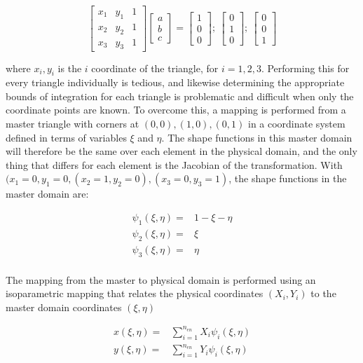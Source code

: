 \documentclass[10pt]{article}
\newcommand{\beq}{\begin{equation}}
\newcommand{\eeq}{\end{equation}}
\newcommand{\beqa}{\begin{equation}\begin{aligned}}
\newcommand{\eeqa}{\end{aligned}\end{equation}}
\begin{document}
\beq
\begin{bmatrix} x_1 & y_1 & 1\\x_2 & y_2 & 1\\x_3 & y_3 & 1\end{bmatrix}
\begin{bmatrix}a\\ b\\ c\end{bmatrix}=\begin{bmatrix}1\\ 0\\ 0\end{bmatrix};\ \begin{bmatrix}0\\ 1\\ 0\end{bmatrix};\ \begin{bmatrix}0\\ 0\\ 1\end{bmatrix}
\eeq

where \(x_i, y_i\) is the \(i\) coordinate of the triangle, for \(i=1, 2, 3\). Performing this for every triangle individually is tedious, and likewise determining the appropriate bounds of integration for each triangle is problematic and difficult when only the coordinate points are known. To overcome this, a mapping is performed from a master triangle with corners at \((0,0), (1,0), (0,1)\) in a coordinate system defined in terms of variables \(\xi\) and \(\eta\). The shape functions in this master domain will therefore be the same over each element in the physical domain, and the only thing that differs for each element is the Jacobian of the transformation. With \((x_1=0, y_1=0, (x_2=1, y_2=0), (x_3=0,y_3=1)\), the shape functions in the master domain are:

\beqa
\psi_1(\xi,\eta)=&1-\xi-\eta\\
\psi_2(\xi,\eta)=&\xi\\
\psi_3(\xi,\eta)=&\eta\\
\eeqa

The mapping from the master to physical domain is performed using an isoparametric mapping that relates the physical coordinates \((X_i,Y_i)\) to the master domain coordinates \((\xi,\eta)\)

\beqa
x(\xi,\eta)=&\sum_{i=1}^{n_{en}}X_i\psi_i(\xi,\eta)\\
y(\xi,\eta)=&\sum_{i=1}^{n_{en}}Y_i\psi_i(\xi,\eta)\\
\eeqa
\end{document}
